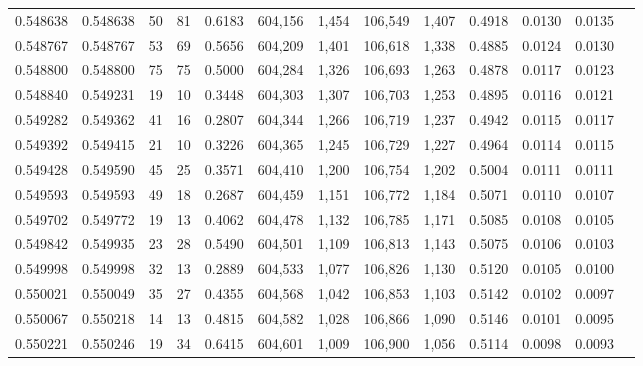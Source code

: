 \begin{tabular}{rrrrrrrrrrrrr}
0.548638 & 0.548638 &    50 &    81 &                                     0.6183 & 604,156 &   1,454 & 106,549 &   1,407 & 0.4918 & 0.0130 & 0.0135 \\
0.548767 & 0.548767 &    53 &    69 &                                     0.5656 & 604,209 &   1,401 & 106,618 &   1,338 & 0.4885 & 0.0124 & 0.0130 \\
0.548800 & 0.548800 &    75 &    75 &                                     0.5000 & 604,284 &   1,326 & 106,693 &   1,263 & 0.4878 & 0.0117 & 0.0123 \\
0.548840 & 0.549231 &    19 &    10 &                                     0.3448 & 604,303 &   1,307 & 106,703 &   1,253 & 0.4895 & 0.0116 & 0.0121 \\
0.549282 & 0.549362 &    41 &    16 &                                     0.2807 & 604,344 &   1,266 & 106,719 &   1,237 & 0.4942 & 0.0115 & 0.0117 \\
0.549392 & 0.549415 &    21 &    10 &                                     0.3226 & 604,365 &   1,245 & 106,729 &   1,227 & 0.4964 & 0.0114 & 0.0115 \\
0.549428 & 0.549590 &    45 &    25 &                                     0.3571 & 604,410 &   1,200 & 106,754 &   1,202 & 0.5004 & 0.0111 & 0.0111 \\
0.549593 & 0.549593 &    49 &    18 &                                     0.2687 & 604,459 &   1,151 & 106,772 &   1,184 & 0.5071 & 0.0110 & 0.0107 \\
0.549702 & 0.549772 &    19 &    13 &                                     0.4062 & 604,478 &   1,132 & 106,785 &   1,171 & 0.5085 & 0.0108 & 0.0105 \\
0.549842 & 0.549935 &    23 &    28 &                                     0.5490 & 604,501 &   1,109 & 106,813 &   1,143 & 0.5075 & 0.0106 & 0.0103 \\
0.549998 & 0.549998 &    32 &    13 &                                     0.2889 & 604,533 &   1,077 & 106,826 &   1,130 & 0.5120 & 0.0105 & 0.0100 \\
0.550021 & 0.550049 &    35 &    27 &                                     0.4355 & 604,568 &   1,042 & 106,853 &   1,103 & 0.5142 & 0.0102 & 0.0097 \\
0.550067 & 0.550218 &    14 &    13 &                                     0.4815 & 604,582 &   1,028 & 106,866 &   1,090 & 0.5146 & 0.0101 & 0.0095 \\
0.550221 & 0.550246 &    19 &    34 &                                     0.6415 & 604,601 &   1,009 & 106,900 &   1,056 & 0.5114 & 0.0098 & 0.0093 \\

\end{tabular}
